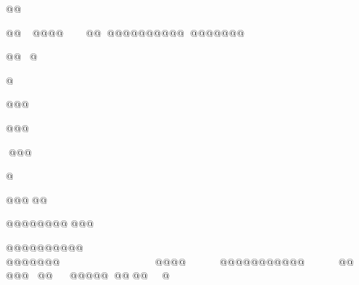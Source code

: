@@








@@@@@@@@@@@@@@@@@@@@@@@@@





@@@



@


@@@

@@@



@@@






@




@@@@@



@@@@@@@@@@@

@@@@@@@@@@
@@@@@@@@@@@@@@@@@@@@@@@@
@@@@@@@@@@@@@@@


































































